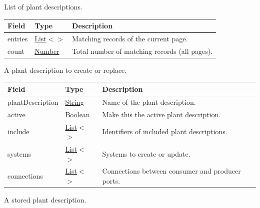 \documentclass[a4paper]{arrowhead}
\newcommand{\mref}[2][]{{\textcolor{ArrowheadPurple}{\hyperref[sec:model:#2]{\ifstrempty{#1}{#2}{#1}}}}}
\newcommand{\pref}[1]{{\textcolor{ArrowheadGrey}{\hyperref[sec:model:primitives:#1]{#1}}}}
\begin{document}

List of plant descriptions.


\noindent\begin{tabularx}{\textwidth}{| >{\raggedright\arraybackslash}p{3.9cm} | >{\raggedright\arraybackslash\small}p{5.3cm} | X |} \hline
\rowcolor{gray!33} Field & Type & Description \\ \hline
entries & \pref{List}$<$\allowbreak{}\mref{PlantDescriptionResponse}$>$ & Matching records of the current page. \\ \hline
count & \pref{Number} & Total number of matching records (all pages). \\ \hline
\end{tabularx}




A plant description to create or replace.


\noindent\begin{tabularx}{\textwidth}{| >{\raggedright\arraybackslash}p{3.9cm} | >{\raggedright\arraybackslash\small}p{5.3cm} | X |} \hline
\rowcolor{gray!33} Field & Type & Description \\ \hline
plant\allowbreak{}Description & \pref{String} & Name of the plant description. \\ \hline
active & \pref{Boolean} & Make this the active plant description. \\ \hline
include & \pref{List}$<$\allowbreak{}\pref{Number}$>$ & Identifiers of included plant descriptions. \\ \hline
systems & \pref{List}$<$\allowbreak{}\mref{PdeSystem}$>$ & Systems to create or update. \\ \hline
connections & \pref{List}$<$\allowbreak{}\mref{Connection}$>$ & Connections between consumer and producer ports. \\ \hline
\end{tabularx}




A stored plant description.
\end{document}
